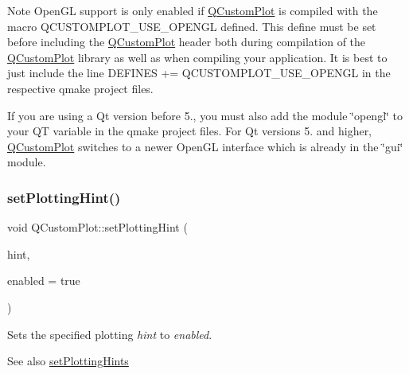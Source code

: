 \begin{DoxyNote}{Note}
Open\+GL support is only enabled if \hyperlink{class_q_custom_plot}{Q\+Custom\+Plot} is compiled with the macro {\ttfamily Q\+C\+U\+S\+T\+O\+M\+P\+L\+O\+T\+\_\+\+U\+S\+E\+\_\+\+O\+P\+E\+N\+GL} defined. This define must be set before including the \hyperlink{class_q_custom_plot}{Q\+Custom\+Plot} header both during compilation of the \hyperlink{class_q_custom_plot}{Q\+Custom\+Plot} library as well as when compiling your application. It is best to just include the line {\ttfamily D\+E\+F\+I\+N\+ES += Q\+C\+U\+S\+T\+O\+M\+P\+L\+O\+T\+\_\+\+U\+S\+E\+\_\+\+O\+P\+E\+N\+GL} in the respective qmake project files. 

If you are using a Qt version before 5., you must also add the module \char`\"{}opengl\char`\"{} to your {\ttfamily QT} variable in the qmake project files. For Qt versions 5. and higher, \hyperlink{class_q_custom_plot}{Q\+Custom\+Plot} switches to a newer Open\+GL interface which is already in the \char`\"{}gui\char`\"{} module. 
\end{DoxyNote}
\mbox{\label{class_q_custom_plot_a3b7c97bb6c16464e9e15190c07abe9a9}} 
\subsubsection{\texorpdfstring{set\+Plotting\+Hint()}{setPlottingHint()}}
{\footnotesize\ttfamily void Q\+Custom\+Plot\+::set\+Plotting\+Hint (\begin{DoxyParamCaption}\item[{\hyperlink{namespace_q_c_p_a5400e5fcb9528d92002ddb938c1f4ef4}{Q\+C\+P\+::\+Plotting\+Hint}}]{hint,  }\item[{bool}]{enabled = {\ttfamily true} }\end{DoxyParamCaption})}

Sets the specified plotting {\itshape hint} to {\itshape enabled}.

\begin{DoxySeeAlso}{See also}
\hyperlink{class_q_custom_plot_a94a33cbdadbbac5934843508bcfc210d}{set\+Plotting\+Hints} 
\end{DoxySeeAlso}
\mbox{\label{class_q_custom_plot_a94a33cbdadbbac5934843508bcfc210d}} 
